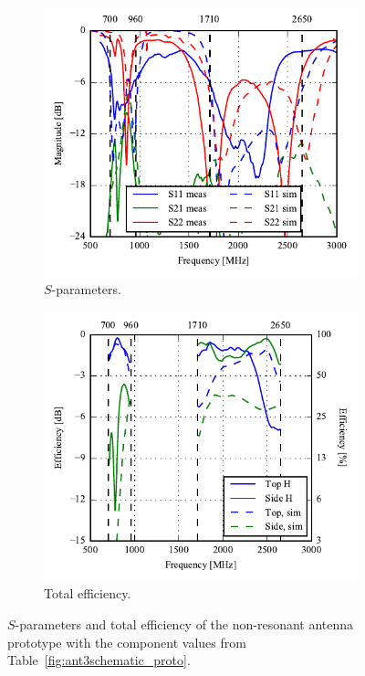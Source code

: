  \begin{figure}[htbp]
    \centering
    \begin{subfigure}{0.49\linewidth}
        \includegraphics{img/tech_sol/nonresonant/prototype/sparams.pdf}
        \caption{$S$-parameters.}
    \end{subfigure}
    \hfill
    \begin{subfigure}{0.49\linewidth}
    \includegraphics{img/tech_sol/nonresonant/prototype/eff_comp.pdf}
        \caption{Total efficiency.}
    \end{subfigure}
    \caption{$S$-parameters and total efficiency of the non-resonant antenna prototype with the component values from Table~\ref{fig:ant3schematic_proto}.}
    \label{fig:nonresonant_proto_sparam_eff}
\end{figure}

